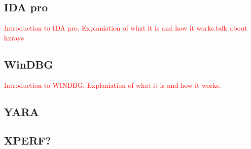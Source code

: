 \subsection{IDA pro}\label{IDA}
\textcolor{red}{Introduction to IDA pro. Explaniation of what it is and how it works.talk about hxrays}
\subsection{WinDBG}
\textcolor{red}{Introduction to WINDBG. Explaniation of what it is and how it works.}
\subsection{YARA}
\subsection{XPERF? }
